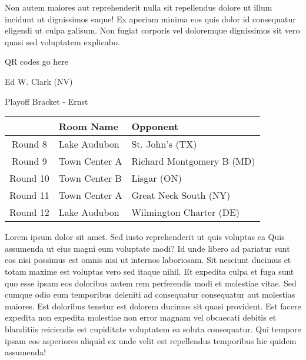 \documentclass{article}%
\begin{document}
\newline%
Non autem maiores aut reprehenderit nulla sit repellendus dolore ut illum incidunt ut dignissimos eaque! Ex aperiam minima eos quis dolor id consequatur eligendi ut culpa galisum. Non fugiat corporis vel doloremque dignissimos sit vero quasi sed voluptatem explicabo.\newline%
\newline%
%
\vspace*{30pt}%
\begin{center}%
\begin{Huge}%
QR codes go here%
\end{Huge}%
\end{center}%
\newpage%
\begin{center}%
\begin{Huge}%
Ed W. Clark (NV)%
\end{Huge}%
\vspace*{8pt}%
\linebreak%
\begin{Large}%
Playoff Bracket {-} Ernst%
\end{Large}%
\end{center}%
\begin{tabularx}{\textwidth}{|c|Y|Y|}%
\hline%
&Room Name&Opponent\\%
\hline%
Round 8&Lake Audubon&St. John's (TX)\\%
Round 9&Town Center A&Richard Montgomery B (MD)\\%
Round 10&Town Center B&Lisgar (ON)\\%
Round 11&Town Center A&Great Neck South (NY)\\%
Round 12&Lake Audubon&Wilmington Charter (DE)\\%
\hline%
\end{tabularx}%
\vspace*{8pt}%
\linebreak%
\newline%
\newline%
Lorem ipsum dolor sit amet. Sed iusto reprehenderit ut quis voluptas ea Quis assumenda ut eius magni eum voluptate modi? Id unde libero ad pariatur sunt eos nisi possimus est omnis nisi ut internos laboriosam. Sit nesciunt ducimus et totam maxime est voluptas vero sed itaque nihil. Et expedita culpa et fuga sunt quo esse ipsam eos doloribus autem rem perferendis modi et molestiae vitae.\newline%
\newline%
Sed cumque odio eum temporibus deleniti ad consequatur consequatur aut molestias maiores. Est doloribus tenetur est dolorem ducimus sit quasi provident. Est facere expedita non expedita molestiae non error magnam vel obcaecati debitis et blanditiis reiciendis est cupiditate voluptatem ea soluta consequatur. Qui tempore ipsam eos asperiores aliquid ex unde velit est repellendus temporibus hic quidem assumenda!\newline%
\end{document}
